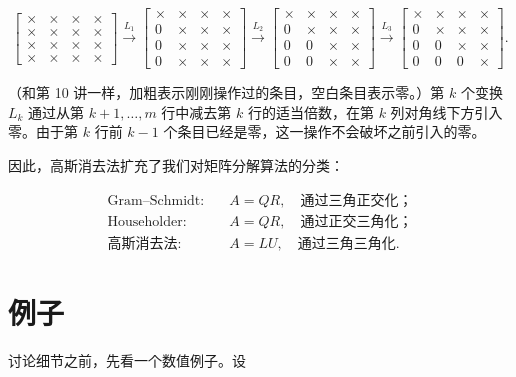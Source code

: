 \documentclass[UTF8,fontset=none,12pt]{ctexart}
\theoremstyle{definition}
\begin{document}
\begin{equation*}
\begin{bmatrix}
\times&\times&\times&\times\\
\times&\times&\times&\times\\
\times&\times&\times&\times\\
\times&\times&\times&\times
\end{bmatrix}
\xrightarrow{L_1}
\begin{bmatrix}
\times&\times&\times&\times\\
0&\times&\times&\times\\
0&\times&\times&\times\\
0&\times&\times&\times
\end{bmatrix}
\xrightarrow{L_2}
\begin{bmatrix}
\times&\times&\times&\times\\
0&\times&\times&\times\\
0&0&\times&\times\\
0&0&\times&\times
\end{bmatrix}
\xrightarrow{L_3}
\begin{bmatrix}
\times&\times&\times&\times\\
0&\times&\times&\times\\
0&0&\times&\times\\
0&0&0&\times
\end{bmatrix}.
\end{equation*}

（和第 10 讲一样，加粗表示刚刚操作过的条目，空白条目表示零。）第 $k$ 个变换 $L_k$ 通过从第 $k+1,\ldots,m$ 行中减去第 $k$ 行的适当倍数，在第 $k$ 列对角线下方引入零。由于第 $k$ 行前 $k-1$ 个条目已经是零，这一操作不会破坏之前引入的零。

因此，高斯消去法扩充了我们对矩阵分解算法的分类：

\begin{align*}
\text{Gram--Schmidt:}\quad &A=QR,\quad \text{通过三角正交化；}\\
\text{Householder:}\quad &A=QR,\quad \text{通过正交三角化；}\\
\text{高斯消去法:}\quad &A=LU,\quad \text{通过三角三角化}.
\end{align*}

\section*{例子}

讨论细节之前，先看一个数值例子。设
\end{document}
